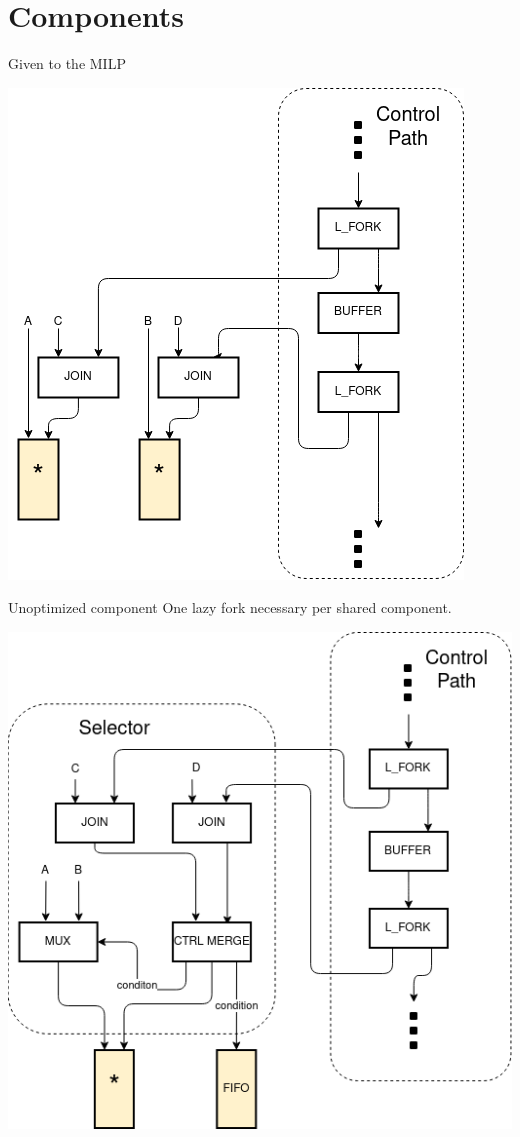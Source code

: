 \documentclass{beamer}
\begin{document}
\section{Components}
\begin{frame}{Given to the MILP}
\begin{center}
\includegraphics[scale=0.4]{given_to_milp.png}
\end{center}
\end{frame}

\begin{frame}{Unoptimized component}
One lazy fork necessary per shared component.
\begin{center}
\includegraphics[scale=0.4]{simple_selector.png}
\end{center}
\end{frame}
\end{document}
